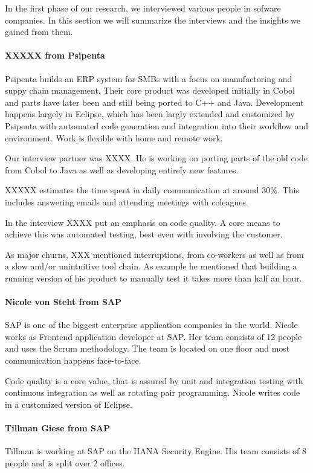 In the first phase of our research, we interviewed various people in sofware companies. In this section we will summarize the interviews and the insights we gained from them.

\paragraph{XXXXX from Psipenta}
Psipenta builds an ERP system for SMBs with a focus on manufactoring and suppy chain management. Their core product was developed initially in Cobol and parts have later been and still being ported to C++ and Java. Development happens largely in Eclipse, which has been largly extended and customized by Psipenta with automated code generation and integration into their workflow and environment. Work is flexible with home and remote work.

Our interview partner was XXXX. He is working on porting parts of the old code from Cobol to Java as well as developing entirely new features.

XXXXX estimates the time spent in daily communication at around 30\%. This includes answering emails and attending meetings with coleagues.

In the interview XXXX put an emphasis on code quality. A core means to achieve this was automated testing, best even with involving the customer.

As major churns, XXX mentioned interruptions, from co-workers as well as from a slow and/or unintuitive tool chain. As example he mentioned that building a running version of his product to manually test it takes more than half an hour.

\paragraph{Nicole von Steht from SAP}
SAP is one of the biggest enterprise application companies in the world. Nicole works as Frontend application developer at SAP. Her team consists of 12 people and uses the Scrum methodology. The team is located on one floor and most communication happens face-to-face.

Code quality is a core value, that is assured by unit and integration testing with continuous integration as well as rotating pair programming. Nicole writes code in a customized version of Eclipse.

\paragraph{Tillman Giese from SAP}
Tillman is working at SAP on the HANA Security Engine. His team consists of 8 people and is split over 2 offices.

